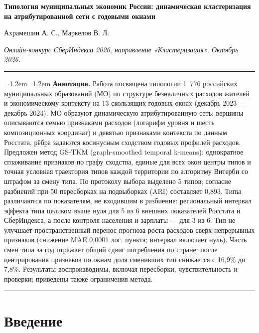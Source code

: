\documentclass[11pt,a4paper]{article}
\newenvironment{absbox}{\par\begingroup\small\setlength{\parindent}{0pt}\leftskip=1.2em\rightskip=1.2em\ignorespaces}{\par\endgroup}
\begin{document}
\thispagestyle{plain}
\begin{center}
{\LARGE\bfseries\color{ink} Типология муниципальных экономик России: динамическая кластеризация на атрибутированной сети с годовыми окнами\par}
\vspace{1.1em}
{\large Ахрамешин А. С., Маркелов В. Л.\par}
\vspace{0.5em}
{\small\itshape Онлайн-конкурс СберИндекса 2026, направление «Кластеризация». Октябрь 2026.\par}
\end{center}
\vspace{0.8em}
{\color{rule}\hrule}
\vspace{0.9em}
\begin{absbox}
\textbf{Аннотация.} Работа посвящена типологии 1~776 российских муниципальных образований (МО) по структуре безналичных расходов жителей и экономическому контексту на 13 скользящих годовых окнах (декабрь 2023 --- декабрь 2024). МО образуют динамическую атрибутированную сеть: вершины описываются семью признаками расходов (логарифм уровня и шесть композиционных координат) и девятью признаками контекста по данным Росстата, рёбра задаются косинусным сходством годовых профилей расходов. Предложен метод GS-TKM (graph-smoothed temporal k-means): однократное сглаживание признаков по графу сходства, единые для всех окон центры типов и точная условная траектория типов каждой территории по алгоритму Витерби со штрафом за смену типа. По протоколу выбора выделено 5 типов; согласие разбиений при 50 пересборках на подвыборках (ARI) составляет 0,893. Типы различаются по показателям, не входившим в разбиение: региональный интервал эффекта типа целиком выше нуля для 5 из 6 внешних показателей Росстата и СберИндекса, а после контроля населения и зарплаты --- для 3 из 6. Тип не улучшает пространственный перенос прогноза роста расходов сверх непрерывных признаков (снижение MAE 0,0001 лог. пункта; интервал включает нуль). Часть смен типа за год отражает общий сдвиг потребления по стране: после центрирования признаков по окнам доля сменивших тип снижается с 16,9\% до 7,8\%. Результаты воспроизводимы, включая пересборки, чувствительность и проверки; приведены также ограничения метода.
\end{absbox}
\vspace{0.7em}
{\color{rule}\hrule}
\vspace{0.4em}
\section{Введение}\label{ux432ux432ux435ux434ux435ux43dux438ux435}
\end{document}
